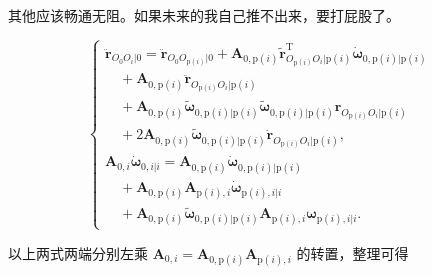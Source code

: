 其他应该畅通无阻。如果未来的我自己推不出来，要打屁股了。

\[
\begin{cases}
\ddot{\boldsymbol{r}}_{O_0 O_i|0} = \ddot{\boldsymbol{r}}_{O_0 O_{\mathrm{p}(i)}|0} + \boldsymbol{A}_{0,\mathrm{p}(i)} \tilde{\boldsymbol{r}}_{O_{\mathrm{p}(i)} O_i|\mathrm{p}(i)}^{\mathrm{T}} \dot{\boldsymbol{\omega}}_{0,\mathrm{p}(i)|\mathrm{p}(i)} \\
\quad + \boldsymbol{A}_{0,\mathrm{p}(i)} \ddot{\boldsymbol{r}}_{O_{\mathrm{p}(i)} O_i|\mathrm{p}(i)} \\
\quad + \boldsymbol{A}_{0,\mathrm{p}(i)} \tilde{\boldsymbol{\omega}}_{0,\mathrm{p}(i)|\mathrm{p}(i)} \tilde{\boldsymbol{\omega}}_{0,\mathrm{p}(i)|\mathrm{p}(i)} \boldsymbol{r}_{O_{\mathrm{p}(i)} O_i|\mathrm{p}(i)} \\
\quad + 2 \boldsymbol{A}_{0,\mathrm{p}(i)} \tilde{\boldsymbol{\omega}}_{0,\mathrm{p}(i)|\mathrm{p}(i)} \dot{\boldsymbol{r}}_{O_{\mathrm{p}(i)} O_i|\mathrm{p}(i)}, \\[6pt]
\boldsymbol{A}_{0,i} \dot{\boldsymbol{\omega}}_{0,i|i} = \boldsymbol{A}_{0,\mathrm{p}(i)} \dot{\boldsymbol{\omega}}_{0,\mathrm{p}(i)|\mathrm{p}(i)} \\
\quad + \boldsymbol{A}_{0,\mathrm{p}(i)} \boldsymbol{A}_{\mathrm{p}(i),i} \dot{\boldsymbol{\omega}}_{\mathrm{p}(i),i|i} \\
\quad + \boldsymbol{A}_{0,\mathrm{p}(i)} \tilde{\boldsymbol{\omega}}_{0,\mathrm{p}(i)|\mathrm{p}(i)} \boldsymbol{A}_{\mathrm{p}(i),i} \boldsymbol{\omega}_{\mathrm{p}(i),i|i}.
\end{cases}
\]

以上两式两端分别左乘 $\boldsymbol{A}_{0,i} = \boldsymbol{A}_{0,\mathrm{p}(i)} \boldsymbol{A}_{\mathrm{p}(i),i}$ 的转置，整理可得

